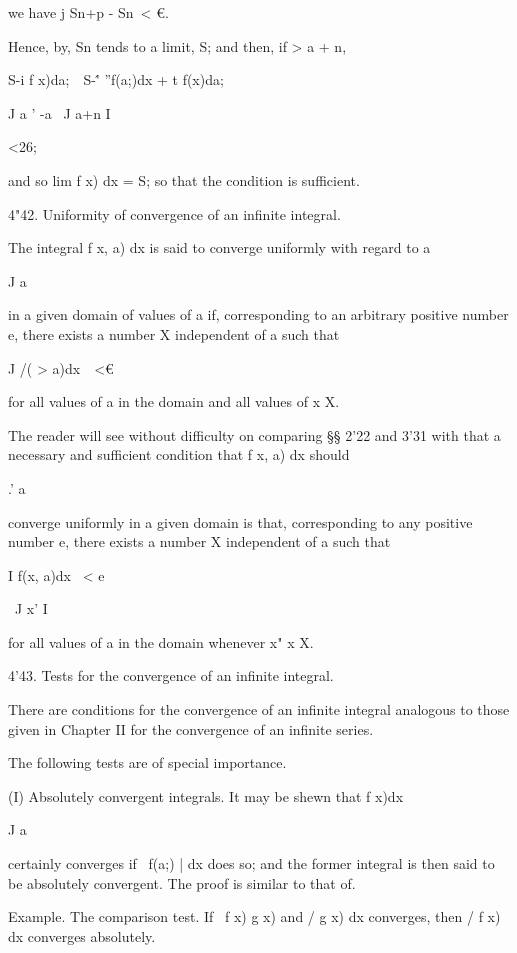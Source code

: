 we have j Sn+p - Sn\ < €.

Hence, by, Sn tends to a limit, S; and then, if > a + n,

S-i f x)da;\ \ S-\'' ''f(a;)dx + t f(x)da;\

J a ' -a \ J a+n I

<26;

and so lim f x) dx = S; so that the condition is sufficient.

4"42. Uniformity of convergence of an infinite integral.

The integral f x, a) dx is said to converge uniformly with regard to a

J a

in a given domain of values of a if, corresponding to an arbitrary
positive number e, there exists a number X independent of a such that

J /( > a)dx\ \ <€

for all values of a in the domain and all values of x X.

The reader will see without difficulty on comparing §§ 2'22 and 3'31
with that a necessary and sufficient condition that f x, a) dx
should

.' a

converge uniformly in a given domain is that, corresponding to any
positive number e, there exists a number X independent of a such that

I f(x, a)dx \ < e

\ J x' I

for all values of a in the domain whenever x" x X.

4'43. Tests for the convergence of an infinite integral.

There are conditions for the convergence of an infinite integral
analogous to those given in Chapter II for the convergence of an
infinite series.

The following tests are of special importance.

%
%

(I) Absolutely convergent integrals. It may be shewn that f x)dx

J a

certainly converges if \ f(a;) | dx does so; and the former integral
is then said to be absolutely convergent. The proof is similar to that
of.

Example. The comparison test. If \ f x) g x) and / g x) dx converges,
then / f x) dx converges absolutely.

